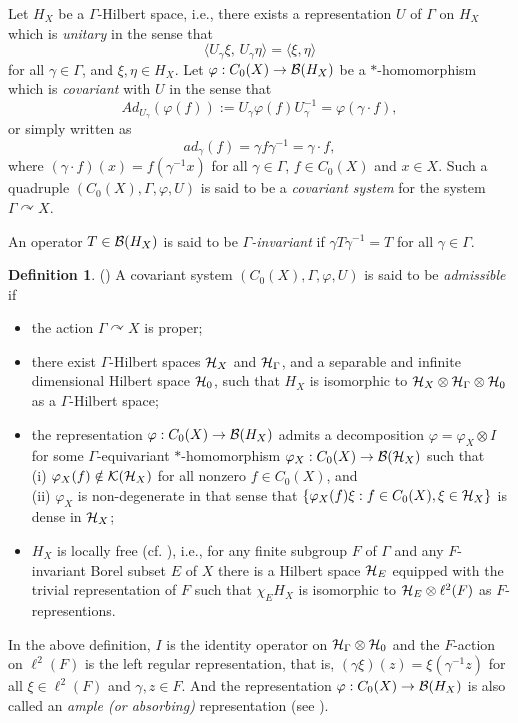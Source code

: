 \documentclass[11pt]{article}
\theoremstyle{definition}
\newtheorem{Def}{Definition}[section]
\theoremstyle{plain}
\def\Ga{\Gamma}
\def\car{\curvearrowright}
\begin{document}
Let $H_X$ be a $\Gamma$-Hilbert space, i.e., there exists a representation $U$ of $\Gamma$ on $H_X$ which is {\em unitary} in the sense that
$$\langle U_\gamma \xi, \, U_\gamma \eta \rangle = \langle \xi, \eta \rangle$$
for all $\gamma\in \Gamma$, and $\xi, \eta\in H_X$. Let $\varphi: C_0(X)\to \mathcal B(H_X)$ be a $*$-homomorphism which is {\em covariant} with $U$ in the sense that
$$Ad_{U_\gamma} (\varphi(f)) := U_\gamma \varphi(f) U_\gamma^{-1} = \varphi(\gamma\cdot f),$$
or simply written as
$$ad_\gamma (f)=\gamma f \gamma^{-1} =\gamma\cdot f,$$
where $(\gamma\cdot f)(x)=f(\gamma^{-1}x)$ for all $\gamma\in \Gamma$, $f\in C_0(X)$ and $x\in X$. Such a quadruple $(C_0(X), \Gamma, \varphi, U)$ is said to be a {\em covariant system} for the system $\Gamma\curvearrowright X$.
\par
An operator $T\in\mathcal B(H_X)$ is said to be {\em $\Gamma$-invariant} if $\gamma T \gamma^{-1} =T$ for all $\gamma\in \Gamma$.
\par
\begin{Def}(\cite{KY2012})
A covariant system $(C_0(X), \Gamma, \varphi, U)$ is said to be {\em admissible} if \begin{itemize}
\item[(1)] the action $\Ga\car X$ is proper; 
\item[(2)] there exist $\Gamma$-Hilbert spaces $\mathcal H_X$ and $\mathcal H_\Gamma$, and a separable and infinite dimensional Hilbert space $\mathcal H_0$,
such that $H_X$ is isomorphic to $\mathcal H_X\otimes \mathcal H_\Gamma \otimes \mathcal H_0$ as a $\Gamma$-Hilbert space; 
\item[(3)] the representation $\varphi: C_0(X)\to\mathcal B(H_X)$ admits a decomposition $\varphi=\varphi_X\otimes I$ for some $\Gamma$-equivariant $*$-homomorphism $\varphi_X: C_0(X)\to\mathcal B(\mathcal H_X)$ such that
\\(i) $\varphi_X(f)\notin \mathcal K(\mathcal H_X)$ for all nonzero $f\in C_0(X)$, and
\\(ii) $\varphi_X$ is non-degenerate in that sense that $\{\varphi_X(f) \xi: f\in C_0(X), \xi\in \mathcal H_X\}$ is dense in $\mathcal H_X$; 
\item[(4)] $H_X$ is locally free (cf. \cite{HIT2020}), i.e., for any finite subgroup $F$ of $\Gamma$ and any $F$-invariant Borel subset $E$ of $X$ there is a Hilbert space $\mathcal H_E$ equipped with the trivial representation of $F$ such that $\chi_E H_X$ is isomorphic to $\mathcal H_E\otimes \ell^2(F)$ as $F$-representions.
\end{itemize}\end{Def}

In the above definition, $I$ is the identity operator on $\mathcal H_\Gamma\otimes \mathcal H_0$ and the $F$-action on $\ell^2(F)$ is the left regular representation, that is, $(\gamma \xi) (z)=\xi(\gamma^{-1} z)$ for all $\xi\in \ell^2(F)$ and $\gamma,z\in F$. And the representation $\varphi:C_0(X)\to\mathcal B(H_X)$ is also called an \emph{ample (or absorbing)} representation (see \cite[Definition 4.5.2]{HIT2020}).
\end{document}
